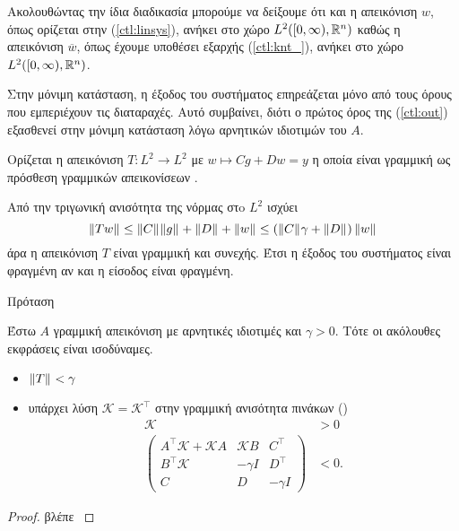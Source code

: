 Ακολουθώντας την ίδια διαδικασία μπορούμε να δείξουμε ότι και η απεικόνιση $w$,
όπως ορίζεται στην (\ref{ctl:linsys}), ανήκει στο χώρο $L^2([0, \infty), 
\mathbb{R}^{n})$ καθώς η απεικόνιση $\overline{w}$, όπως έχουμε υποθέσει εξαρχής 
(\ref{ctl:knt_}), ανήκει στο χώρο $L^2([0, \infty), \mathbb{R}^{n})$.

Στην μόνιμη κατάσταση, η έξοδος του συστήματος επηρεάζεται μόνο από τους όρους 
που εμπεριέχουν τις διαταραχές. Αυτό συμβαίνει, διότι ο πρώτος όρος της 
(\ref{ctl:out}) εξασθενεί στην μόνιμη κατάσταση λόγω αρνητικών ιδιοτιμών του 
$A$. 

Ορίζεται η απεικόνιση $T\colon L^2 \to L^2$ με $w 
\mapsto C g + D w = y$ η οποία είναι γραμμική ως πρόσθεση γραμμικών απεικονίσεων
. 

Από την τριγωνική ανισότητα της νόρμας στo $L^2$ ισχύει
\[\|T w\|_{} \le \|C\|_{} \|g\|_{} + \|D\|_{} + \|w\|_{} \le \left(\|C\|_{} 
\gamma + \|D\|_{}\right)\|w\|_{}\]
άρα η απεικόνιση $T$ είναι γραμμική και συνεχής. Έτσι η έξοδος του συστήματος 
είναι φραγμένη αν και η είσοδος είναι φραγμένη.

\begin{namedthrm}{Πρόταση}{}
    
    Έστω $A$ γραμμική απεικόνιση με αρνητικές ιδιοτιμές και $\gamma > 0$. Τότε 
    οι ακόλουθες εκφράσεις είναι ισοδύναμες.
    \begin{itemize}
        \item $\|T\|_{} < \gamma$ 
        \item υπάρχει λύση $\mathcal{K} = \mathcal{K}^{\intercal}$ στην γραμμική
         ανισότητα πινάκων ()
        \begin{equation}
            \begin{aligned}
                \mathcal{K} &> 0 \\
                \begin{pmatrix}
                    A^{\intercal} \mathcal{K} + \mathcal{K} A & \mathcal{K} B 
                    & C^{\intercal} \\
                    B^{\intercal} \mathcal{K} & -\gamma I & D^{\intercal} \\
                    C & D & -\gamma I
                \end{pmatrix}
                &< 0. 
            \end{aligned}
            \label{ctl:LMI}
        \end{equation}     
    \end{itemize}
    \label{ctl:lemma}
\end{namedthrm}
\begin{proof}
    βλέπε \cite{Scherer}
\end{proof}

